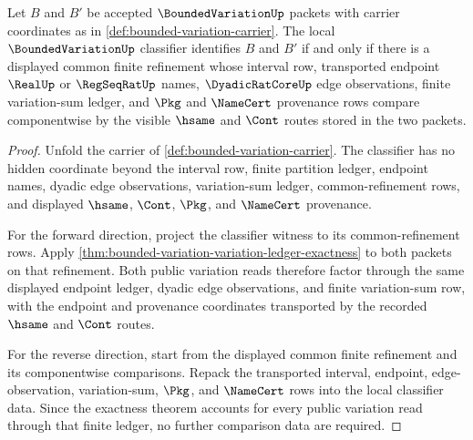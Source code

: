 \begin{theorem}
\label{thm:bounded-variation-common-refinement-classifier-exactness}
Let $B$ and $B'$ be accepted $\BoundedVariationUp$ packets with carrier coordinates as in \autoref{def:bounded-variation-carrier}. The local $\BoundedVariationUp$ classifier identifies $B$ and $B'$ if and only if there is a displayed common finite refinement whose interval row, transported endpoint $\RealUp$ or $\RegSeqRatUp$ names, $\DyadicRatCoreUp$ edge observations, finite variation-sum ledger, and $\Pkg$ and $\NameCert$ provenance rows compare componentwise by the visible $\hsame$ and $\Cont$ routes stored in the two packets.
\end{theorem}
\begin{proof}
Unfold the carrier of \autoref{def:bounded-variation-carrier}. The classifier has no hidden coordinate beyond the interval row, finite partition ledger, endpoint names, dyadic edge observations, variation-sum ledger, common-refinement rows, and displayed $\hsame$, $\Cont$, $\Pkg$, and $\NameCert$ provenance.

For the forward direction, project the classifier witness to its common-refinement rows. Apply \autoref{thm:bounded-variation-variation-ledger-exactness} to both packets on that refinement. Both public variation reads therefore factor through the same displayed endpoint ledger, dyadic edge observations, and finite variation-sum row, with the endpoint and provenance coordinates transported by the recorded $\hsame$ and $\Cont$ routes.

For the reverse direction, start from the displayed common finite refinement and its componentwise comparisons. Repack the transported interval, endpoint, edge-observation, variation-sum, $\Pkg$, and $\NameCert$ rows into the local classifier data. Since the exactness theorem accounts for every public variation read through that finite ledger, no further comparison data are required.
\end{proof}


